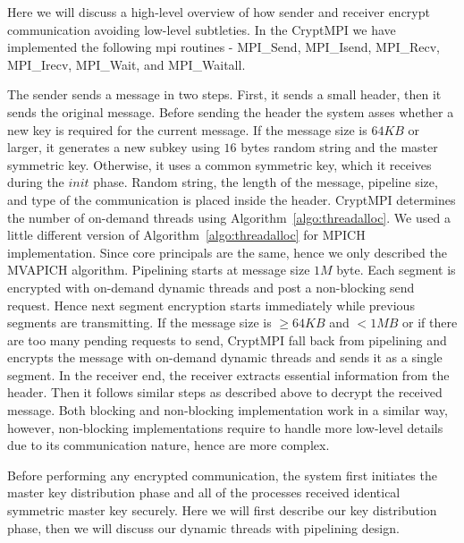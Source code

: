 Here we will discuss a high-level overview of how sender and receiver encrypt
 communication avoiding low-level subtleties. In the CryptMPI we have 
 implemented the following mpi routines - MPI\_Send, MPI\_Isend, MPI\_Recv, 
 MPI\_Irecv, MPI\_Wait, and MPI\_Waitall.
 
The sender sends a message in two steps. First, it sends a small header, then
it sends the original message. Before sending the header the system asses whether
 a new key is required for the current message. If the message size is $64KB$ or
larger, it generates a new subkey using $16$ bytes random string and the master
symmetric key. Otherwise, it uses a common symmetric key, which it receives during
  the $init$ phase. Random string, the length of the message, pipeline size, and 
type of the communication is placed inside the header. CryptMPI determines 
the number of on-demand threads using Algorithm~\ref{algo:threadalloc}. We 
used a little different version of Algorithm~\ref{algo:threadalloc} for MPICH
 implementation. Since core principals are the same, hence we only described 
 the MVAPICH algorithm. Pipelining starts at message size  $1M$ byte. Each 
 segment is encrypted with on-demand dynamic threads and post a non-blocking
send request. Hence next segment encryption starts immediately while previous
 segments are transmitting. If the message size is $\geq 64KB$ and $< 1MB$ or if
 there are too many pending requests to send, CryptMPI fall back from pipelining
and encrypts the message with on-demand dynamic threads and sends it as a single segment. 
In the receiver end, the receiver extracts essential information from the header.
 Then it follows similar steps as described above to decrypt the received message. Both blocking
 and non-blocking implementation work in a similar way, however, non-blocking implementations
 require to handle more low-level details due to its communication nature, hence are more complex.  

\fi




\iffalse
Before performing any encrypted 
communication, the system first initiates the master key distribution phase and 
all of the processes received identical symmetric master key securely. 
Here we will first describe our key distribution phase, then we will 
discuss our dynamic threads with  pipelining design.

